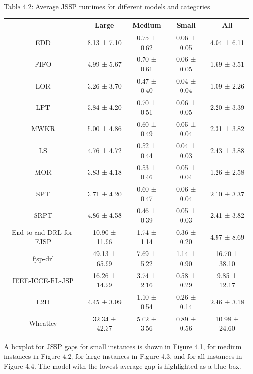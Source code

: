 \begin{table}
    Table 4.2: Average JSSP runtimes for different models and categories\\
    \vspace{1mm}
    \label{table:4.2}
    \small
    \begin{tabular}{ccccc}
        \toprule
        & Large & Medium & Small & All \\
        \midrule
        EDD & 8.13 ± 7.10 & 0.75 ± 0.62 & 0.06 ± 0.05 & 4.04 ± 6.11 \\
        FIFO & 4.99 ± 5.67 & 0.70 ± 0.61 & 0.06 ± 0.05 & 1.69 ± 3.51 \\
        LOR & 3.26 ± 3.70 & 0.47 ± 0.40 & 0.04 ± 0.04 & 1.09 ± 2.26 \\
        LPT & 3.84 ± 4.20 & 0.70 ± 0.51 & 0.06 ± 0.05 & 2.20 ± 3.39 \\
        MWKR & 5.00 ± 4.86 & 0.60 ± 0.49 & 0.05 ± 0.04 & 2.31 ± 3.82 \\
        LS & 4.76 ± 4.72 & 0.52 ± 0.44 & 0.04 ± 0.03 & 2.43 ± 3.88 \\
        MOR & 3.83 ± 4.18 & 0.53 ± 0.46 & 0.05 ± 0.04 & 1.26 ± 2.58 \\
        SPT & 3.71 ± 4.20 & 0.60 ± 0.47 & 0.06 ± 0.04 & 2.10 ± 3.37 \\
        SRPT & 4.86 ± 4.58 & 0.46 ± 0.39 & 0.05 ± 0.03 & 2.41 ± 3.82 \\
        End-to-end-DRL-for-FJSP & 10.90 ± 11.96 & 1.74 ± 1.14 & 0.36 ± 0.20 & 4.97 ± 8.69 \\
        fjsp-drl & 49.13 ± 65.99 & 7.69 ± 5.22 & 1.14 ± 0.90 & 16.70 ± 38.10 \\
        IEEE-ICCE-RL-JSP & 16.26 ± 14.29 & 3.74 ± 2.16 & 0.58 ± 0.29 & 9.85 ± 12.17 \\
        L2D & 4.45 ± 3.99 & 1.10 ± 0.54 & 0.26 ± 0.14 & 2.46 ± 3.18 \\
        Wheatley & 32.34 ± 42.37 & 5.02 ± 3.56 & 0.89 ± 0.56 & 10.98 ± 24.60 \\
        \bottomrule
        \end{tabular}        
\end{table}

A boxplot for JSSP gaps for small instances is shown in Figure 4.1, for medium instances in Figure 4.2, for large instances in Figure 4.3, and for all instances in Figure 4.4. The model with the lowest average gap is highlighted as a blue box.

